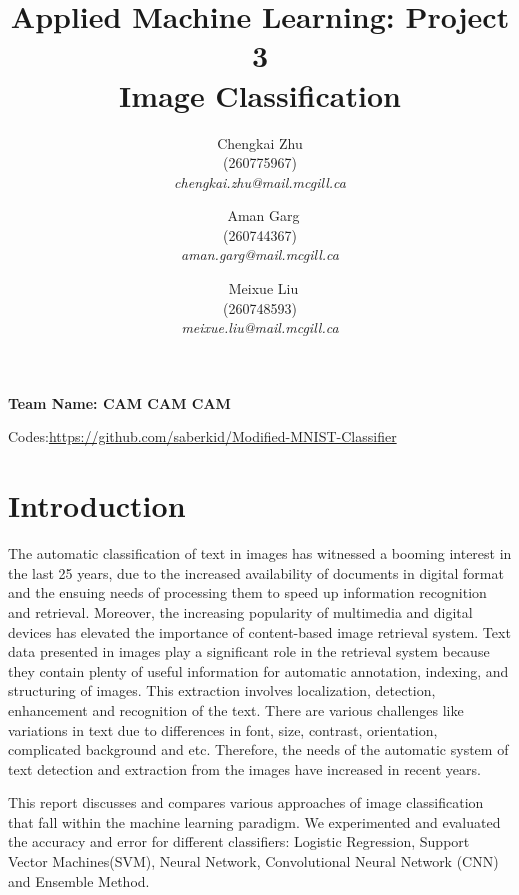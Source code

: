 \documentclass[10pt,conference]{IEEEtran}
\begin{document}
\title{Applied Machine Learning: Project 3 \\ Image Classification}





\author{Chengkai Zhu \\ (260775967) \\ \textit{\normalsize{chengkai.zhu@mail.mcgill.ca}}
\and
\ Aman Garg \\ (260744367) \\ 
\textit{\normalsize{aman.garg@mail.mcgill.ca}}
\and
\ Meixue Liu \\ (260748593) \\ 
\textit{\normalsize{meixue.liu@mail.mcgill.ca}}}






\maketitle

\IEEEpeerreviewmaketitle

\textbf{Team Name: CAM CAM CAM}

Codes:\url{https://github.com/saberkid/Modified-MNIST-Classifier}

\section{Introduction}
The automatic classification of text in images has witnessed a booming interest in the last 25 years, due to the increased availability of documents in digital format and the ensuing needs of processing them to speed up information recognition and retrieval. Moreover, the increasing popularity of multimedia and digital devices has elevated the importance of content-based image retrieval system. Text data presented in images play a significant role in the retrieval system because they contain plenty of useful information for automatic annotation, indexing, and structuring of images. This extraction involves localization, detection, enhancement and recognition of the text. There are various challenges like variations in text due to differences in font, size, contrast, orientation, complicated background and etc. Therefore, the needs of the automatic system of text detection and extraction from the images have increased in recent years.

This report discusses and compares various approaches of image classification that fall within the machine learning paradigm. We experimented and evaluated the accuracy and error for different classifiers: Logistic Regression, Support Vector Machines(SVM), Neural Network, Convolutional Neural Network (CNN) and Ensemble Method.
\end{document}
